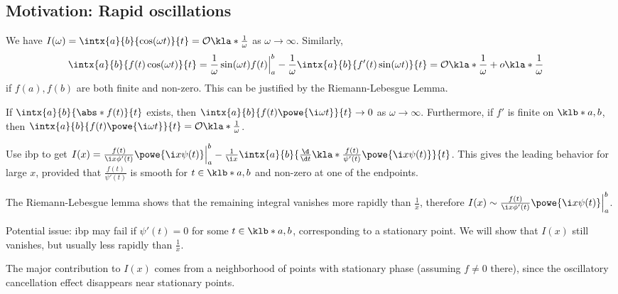 \documentclass[english, parskip=full]{scrbook}
\newcommand{\definition}[2]{\begin{tcolorbox}[colback=colorbackgrounddefinition,colframe=colordefinition, breakable,enhanced,title=\textbf{#1}.]#2\end{tcolorbox}}
\newcommand{\note}[1]{\begin{tcolorbox}[colback=colorbackgroundnote,colframe=colornote, breakable,enhanced]#1\end{tcolorbox}}
\newcommand{\example}[3]{\begin{tcolorbox}[colback=colorbackgroundexample,colframe=colorexample, breakable,enhanced,title={\textbf{#1}: #2.}]#3\end{tcolorbox}}
\begin{document}
\subsection{Motivation: Rapid oscillations}
We have $I(\omega) = \intx{a}{b}{\cos(\omega t)}{t} = \mathcal{O}\kla*{\frac{1}{\omega}}$ as $\omega\rightarrow\infty$.
Similarly,
\begin{align}
\intx{a}{b}{f(t)\cos(\omega t)}{t} &= \frac{1}{\omega} \sin(\omega t) f(t) \Big\vert_a^b - \frac{1}{\omega} \intx{a}{b}{f'(t)\sin(\omega t)}{t} = \mathcal{O}\kla*{\frac{1}{\omega}} + o\kla*{\frac{1}{\omega}}
\end{align}
if $f(a),f(b)$ are both finite and non-zero.
This can be justified by the Riemann-Lebesgue Lemma.
\definition{Riemann-Lebesgue Lemma}{If $\intx{a}{b}{\abs*{f(t)}}{t}$ exists, then $\intx{a}{b}{f(t)\powe{\i\omega t}}{t} \rightarrow 0$ as $\omega\rightarrow\infty$.
Furthermore, if $f'$ is finite on $\klb*{a,b}$, then $\intx{a}{b}{f(t) \powe{\i\omega t}}{t} = \mathcal{O}\kla*{\frac{1}{\omega}}$.
}
\example{A generalized Fourier integral}{$I(x) = \intx{a}{b}{f(t) \powe{\i x\psi(t)}}{t}$ as $x\rightarrow\infty$}{Use \gls{ibp} to get $I(x) = \frac{f(t)}{\i x\phi'(t)} \powe{\i x\psi(t)} \Big\vert_a^b - \frac{1}{\i x} \intx{a}{b}{\frac{\d}{\d t} \kla*{\frac{f(t)}{\psi'(t)}} \powe{\i x\psi(t)}}{t}$.
This gives the leading behavior for large $x$, provided that $\frac{f(t)}{\psi'(t)}$ is smooth for $t\in\klb*{a,b}$ and non-zero at one of the endpoints.

The Riemann-Lebesgue lemma shows that the remaining integral vanishes more rapidly than $\frac{1}{x}$, therefore $I(x) \sim \frac{f(t)}{\i x\phi'(t)} \powe{\i x\psi(t)} \Big\vert_a^b $.
\note{Potential issue: \gls{ibp} may fail if $\psi'(t)=0$ for some $t\in\klb*{a,b}$, corresponding to a stationary point.
We will show that $I(x)$ still vanishes, but usually less rapidly than $\frac{1}{x}$.}
}
The major contribution to $I(x)$ comes from a neighborhood of points with stationary phase (assuming $f\neq 0$ there), since the oscillatory cancellation effect disappears near stationary points.
\end{document}
